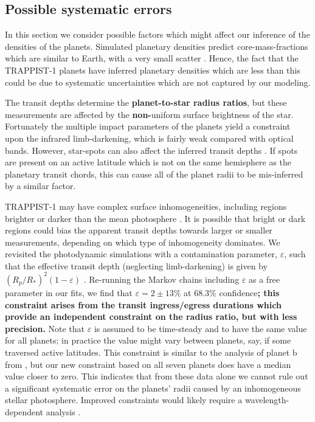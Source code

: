 \documentclass[twocolumn]{aastex63}
\begin{document}
\subsection{Possible systematic errors}

In this section we consider possible factors which might affect our
inference of the densities of the planets.  Simulated planetary
densities predict core-mass-fractions which are similar to
Earth, with a very small scatter \citep{Scora2020}.  Hence, the
fact that the TRAPPIST-1 planets have inferred planetary densities
which are less than this could be due to systematic uncertainties
which are not captured by our modeling.

The transit depths
determine the \textbf{planet-to-star radius ratios}, but these
measurements are affected by the \textbf{non-}uniform surface brightness
of the star.  Fortunately the multiple impact parameters of the
planets yield a constraint upon the infrared limb-darkening, which
is fairly weak compared with optical bands.  However, star-spots
can also affect the inferred transit depths \textbf{\citep{Czesla2009,Oshagh2013, 
Oshagh2014,McCullough2014, Rackham2018, Kipping2012b}}.  If spots are present 
on an active latitude
which is not on the same hemisphere as the planetary transit chords,
this can cause all of the planet radii to be mis-inferred by a similar
factor.

TRAPPIST-1 may have complex surface inhomogeneities, including regions brighter or darker than the mean photosphere  \textbf{\citep{Morris2018d,Zhang2018,Wakeford2019}}. It is possible that bright or dark regions could bias the apparent transit depths towards larger or smaller measurements, depending on which type of inhomogeneity dominates. We revisited the photodynamic simulations with a contamination parameter,
$\varepsilon$, such that the effective transit depth (neglecting limb-darkening) is given by $(R_p/R_*)^2(1-\varepsilon)$
\citep{Morris2018b,Morris2018c}.  Re-running the Markov chains
including $\varepsilon$ as a free parameter in our fits, we
find that $\varepsilon = 2{\pm}13$\% at 68.3\% confidence\textbf{; this constraint arises from the transit ingress/egress durations which provide an independent constraint on the radius ratio, but with less precision.}  Note that $\varepsilon$ is assumed to be time-steady and to have the same value for all planets; in practice the value might vary between planets, say, if some traversed active latitudes.
This constraint is similar to the analysis of planet b from \citet{Morris2018c}, but our new constraint based on all seven planets does have a median value closer to zero.
This indicates that from these data alone we cannot rule out a significant systematic error on the planets' radii caused by an inhomogeneous stellar photosphere.
Improved constraints would likely require a wavelength-dependent analysis \citep[e.g.][]{Rackham2018,Wakeford2019}.
\end{document}
